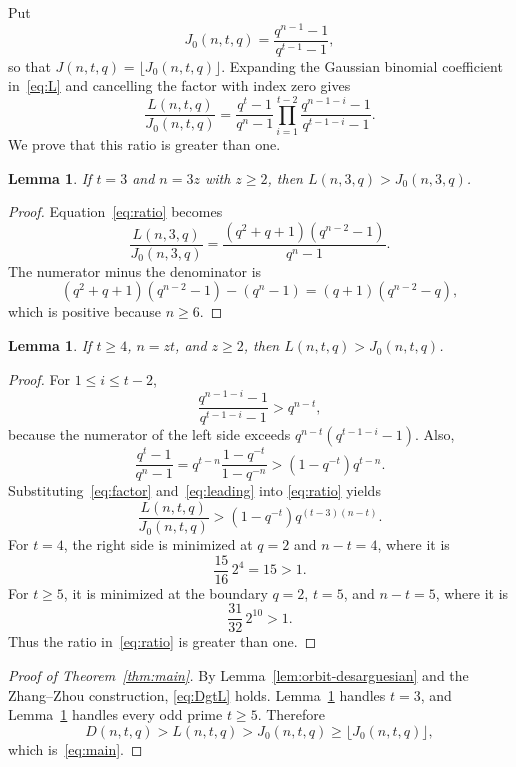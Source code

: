 \documentclass[11pt]{article}
\newtheorem{lemma}[theorem]{Lemma}
\begin{document}
Put
\[
J_0(n,t,q)=\frac{q^{n-1}-1}{q^{t-1}-1},
\]
so that $J(n,t,q)=\lfloor J_0(n,t,q)\rfloor$. Expanding the Gaussian
binomial coefficient in~\eqref{eq:L} and cancelling the factor with index
zero gives
\begin{equation}
\frac{L(n,t,q)}{J_0(n,t,q)}
=
\frac{q^t-1}{q^n-1}
\prod_{i=1}^{t-2}
\frac{q^{n-1-i}-1}{q^{t-1-i}-1}.
\label{eq:ratio}
\end{equation}
We prove that this ratio is greater than one.

\begin{lemma}\label{lem:t3}
If $t=3$ and $n=3z$ with $z\geq2$, then $L(n,3,q)>J_0(n,3,q)$.
\end{lemma}

\begin{proof}
Equation~\eqref{eq:ratio} becomes
\[
\frac{L(n,3,q)}{J_0(n,3,q)}
=
\frac{(q^2+q+1)(q^{n-2}-1)}{q^n-1}.
\]
The numerator minus the denominator is
\[
(q^2+q+1)(q^{n-2}-1)-(q^n-1)
=(q+1)(q^{n-2}-q),
\]
which is positive because $n\geq6$.
\end{proof}

\begin{lemma}\label{lem:t4plus}
If $t\geq4$, $n=zt$, and $z\geq2$, then
$L(n,t,q)>J_0(n,t,q)$.
\end{lemma}

\begin{proof}
For $1\leq i\leq t-2$,
\begin{equation}
\frac{q^{n-1-i}-1}{q^{t-1-i}-1}>q^{n-t},
\label{eq:factor}
\end{equation}
because the numerator of the left side exceeds
$q^{n-t}(q^{t-1-i}-1)$. Also,
\begin{equation}
\frac{q^t-1}{q^n-1}
=q^{t-n}\frac{1-q^{-t}}{1-q^{-n}}
>(1-q^{-t})q^{t-n}.
\label{eq:leading}
\end{equation}
Substituting~\eqref{eq:factor} and~\eqref{eq:leading} into
\eqref{eq:ratio} yields
\begin{equation}
\frac{L(n,t,q)}{J_0(n,t,q)}
>(1-q^{-t})q^{(t-3)(n-t)}.
\label{eq:coarse}
\end{equation}
For $t=4$, the right side is minimized at $q=2$ and $n-t=4$, where it is
\[
\frac{15}{16}\,2^4=15>1.
\]
For $t\geq5$, it is minimized at the boundary $q=2$, $t=5$, and $n-t=5$,
where it is
\[
\frac{31}{32}\,2^{10}>1.
\]
Thus the ratio in~\eqref{eq:ratio} is greater than one.
\end{proof}

\begin{proof}[Proof of Theorem~\ref{thm:main}]
By Lemma~\ref{lem:orbit-desarguesian} and the Zhang--Zhou construction,
\eqref{eq:DgtL} holds. Lemma~\ref{lem:t3} handles $t=3$, and
Lemma~\ref{lem:t4plus} handles every odd prime $t\geq5$. Therefore
\[
D(n,t,q)>L(n,t,q)>J_0(n,t,q)
\geq\lfloor J_0(n,t,q)\rfloor,
\]
which is~\eqref{eq:main}.
\end{proof}
\end{document}
